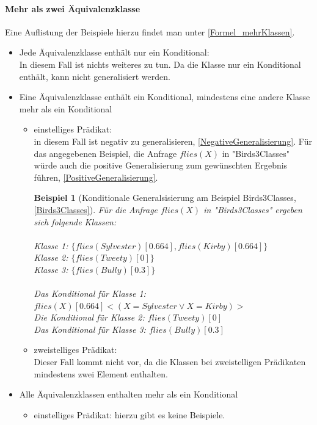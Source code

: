 \documentclass[a4paper, 11pt]{book}
\newtheorem{Bsp}{Beispiel}[section]
\begin{document}
{\paragraph{Mehr als zwei Äquivalenzklasse} 
Eine Auflistung der Beispiele hierzu findet man unter \ref{Formel_mehrKlassen}.
\begin{itemize}
	\item Jede Äquivalenzklasse enthält nur ein Konditional:\\
	In diesem Fall ist nichts weiteres zu tun. Da die Klasse nur ein Konditional enthält, kann nicht generalisiert werden.
	\item Eine Äquivalenzklasse enthält ein Konditional, mindestens eine andere Klasse mehr als ein Konditional
	\begin{itemize}
		\item einstelliges Prädikat:\\
		 in diesem Fall ist negativ zu generalisieren, \ref{NegativeGeneralisierung}. Für das angegebenen Beispiel, die Anfrage $ flies(X) $ in "{}Birds3Classes"{} würde auch die positive Generalisierung zum gewünschten Ergebnis führen, \ref{PositiveGeneralisierung}.
		\begin{Bsp}[Konditionale Generalsisierung am Beispiel Birds3Classes, \ref{Birds3Classes}]
			Für die Anfrage $ flies(X) $ in "{}Birds3Classes"{} ergeben sich folgende Klassen:\\
			\\
			Klasse 1: $ \{flies(Sylvester)[0.664], flies(Kirby)[0.664]\}  $\\
			Klasse 2: $ \{flies(Tweety)[0]\} $\\
			Klasse 3: $ \{flies(Bully)[0.3]\} $\\
			\\
			\noindent
			Das Konditional für Klasse 1: $ flies(X)[0.664]<(X = Sylvester \lor  X = Kirby)>$\\
			Die Konditional für Klasse 2: $ flies(Tweety)[0] $\\
			Das Konditional für Klasse 3: $ flies(Bully)[0.3] $
		\end{Bsp}
		\item zweistelliges Prädikat:\\	
		Dieser Fall kommt nicht vor, da die Klassen bei zweistelligen Prädikaten mindestens zwei Element enthalten.	
	\end{itemize}
	\item Alle Äquivalenzklassen enthalten mehr als ein Konditional
	\begin{itemize}
		\item einstelliges Prädikat: hierzu gibt es keine Beispiele.

\end{itemize}
\end{itemize}}
\end{document}
